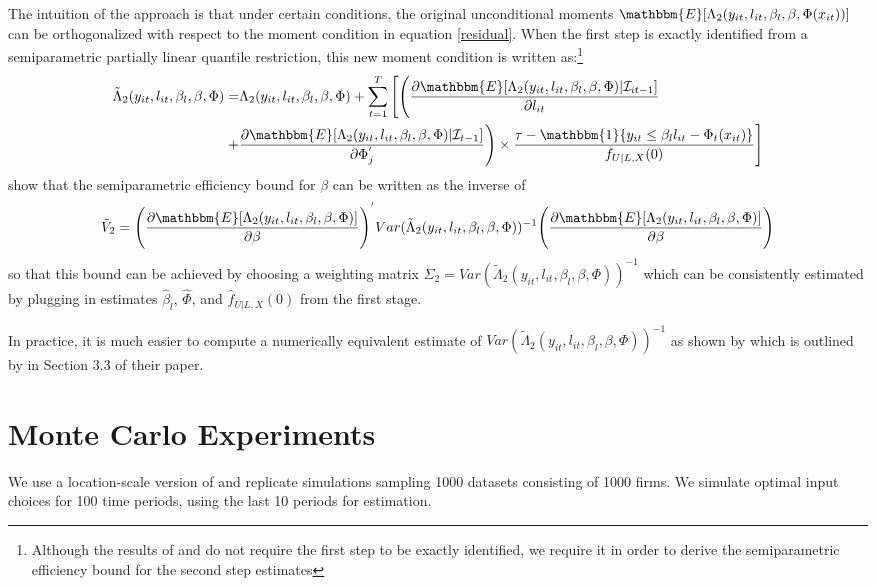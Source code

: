 \documentclass[11pt]{article}
\begin{document}
The intuition of the \cite{Ackerberg2014} approach is that under certain conditions, the original unconditional moments $\mathbbm{E}[\Lambda_{2}(y_{it}, l_{it}, \beta_{l}, \beta, \Phi(x_{it}))]$ can be orthogonalized with respect to the moment condition in equation \eqref{residual}. When the first step is exactly identified from a semiparametric partially linear quantile restriction, this new moment condition is written as:\footnote{Although the results of \cite{Chen2009} and \cite{Ai2012} do not require the first step to be exactly identified, we require it in order to derive the semiparametric efficiency bound for the second step estimates}
\begin{equation}\label{orthomoment}
\begin{split}
\tilde{\Lambda}_{2}(y_{it}, l_{it}, \beta_{l}, \beta, \Phi)=&\Lambda_{2}(y_{it}, l_{it}, \beta_{l}, \beta, \Phi)+\sum_{t=1}^{T}\Bigg[\Bigg(\frac{\partial \mathbbm{E}[\Lambda_{2}(y_{it}, l_{it}, \beta_{l}, \beta, \Phi)|\mathcal{I}_{it-1}]}{\partial l_{it}}\\
+&\frac{\partial \mathbbm{E}[\Lambda_{2}(y_{it}, l_{it}, \beta_{l}, \beta, \Phi)|\mathcal{I}_{t-1}]}{\partial \Phi^{'}_{j}}\Bigg)\times \frac{\tau-\mathbbm{1}\{y_{it}\leq\beta_{l}l_{it}-\Phi_{t}(x_{it})\}}{f_{U|L,X}(0)}\Bigg]
\end{split}
\end{equation}
\cite{Ackerberg2014} show that the semiparametric efficiency bound for $\beta$ can be written as the inverse of
\begin{equation}
\tilde{V}_{2}=\Bigg(\frac{\partial\mathbbm{E}[\Lambda_{2}(y_{it}, l_{it}, \beta_{l}, \beta, \Phi)]}{\partial\beta}\Bigg)^{'}Var(\tilde{\Lambda}_{2}(y_{it}, l_{it}, \beta_{l}, \beta, \Phi))^{-1}\Bigg(\frac{\partial\mathbbm{E}[\Lambda_{2}(y_{it}, l_{it}, \beta_{l}, \beta, \Phi)]}{\partial\beta}\Bigg)
\end{equation}
so that this bound can be achieved by choosing a weighting matrix $\Sigma_{2}=Var(\tilde{\Lambda}_{2}(y_{it}, l_{it}, \beta_{l}, \beta, \Phi))^{-1}$ which can be consistently estimated by plugging in estimates $\hat{\beta}_{l}$, $\hat{\Phi}$, and $\hat{f}_{U|L,X}(0)$ from the first stage.

In practice, it is much easier to compute a numerically equivalent estimate of $Var(\tilde{\Lambda}_{2}(y_{it}, l_{it}, \beta_{l}, \beta, \Phi))^{-1}$ as shown by \cite{Ackerberg2012} which is outlined by \cite{Ackerberg2014} in Section 3.3 of their paper. 

\newpage
\section{Monte Carlo Experiments} \label{montecarlo}
We use a location-scale version of \cite{Levinsohn2003} and replicate \cite{Ackerberg2015} simulations sampling 1000 datasets consisting of 1000 firms. We simulate optimal input choices for 100 time periods, using the last 10 periods for estimation. 
\end{document}
